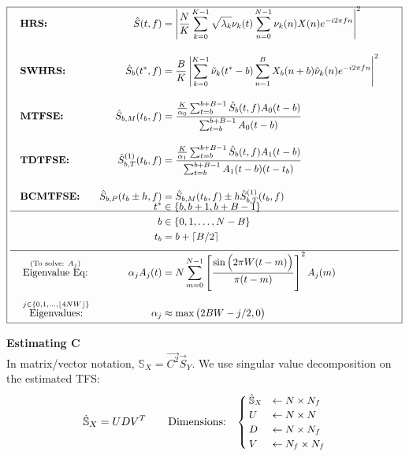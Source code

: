 \[\boxed{
\begin{aligned} &\\[-20pt]
    \quad&\textbf{HRS:}&
    \hat S(t,f)               &= \left|\frac{N}{K}\sum_{k=0}^{K-1}\sqrt{\lambda_k}\nu_k(t)
                                 \sum_{n=0}^{N-1}\nu_k(n)X(n)e^{-i2\pi fn}\right|^2
    \\[10pt]                                          
    &\textbf{SWHRS:}& 
    \hat S_{b}(t^*,f)         &= \frac{B}{K}\left| \sum_{k=0}^{K-1}\tilde\nu_k(t^*-b)
                                 \sum_{n=1}^{B} X_b(n+b)\tilde\nu_k(n)e^{-i2\pi fn} \right|^2\quad
    \\[10pt]
    &\textbf{MTFSE:}& 
    \hat S_{b,M}(t_b,f)       &= \frac{\frac{K}{\alpha_0}\sum_{t=b}^{b+B-1}\hat S_{b}(t,f)A_0(t-b)}
                                 {\sum_{t=b}^{b+B-1} A_0(t-b)}
    \\[10pt]
    &\textbf{TDTFSE:}& 
    \hat S^{(1)}_{b,T}(t_b,f) &= \frac{\frac{K}{\alpha_1}\sum_{t=b}^{b+B-1}\hat S_{b}(t,f)A_1(t-b)}
                                 {\sum_{t=b}^{b+B-1} A_1(t-b)(t-t_b)}
    \\[10pt]
    &\textbf{BCMTFSE:}&
    \hat S_{b,P}(t_b\pm h,f)  &= \hat S_{b,M}(t_b,f) \pm h\hat S^{(1)}_{b,T}(t_b,f)
    \\[7pt]
    \hline \\[-25pt]
    && t^* &\in \{b, b+1, b+B-1\}
    \\
    && b   &\in \{0,1,\dots, N-B\}
    \\
    && t_b &= b + \lceil B/2\rceil
    \\[7pt]
    \hline \\[-15pt]
    &\stackrel{\text{(To solve: }A_j)}{\text{Eigenvalue Eq:}}&
    \alpha_jA_j(t) &= N\sum_{m=0}^{N-1} \left[\frac{\sin\Big(2\pi W(t-m)\Big)}{\pi(t-m)}\right]^2A_j(m)
    \\[5pt]
    &\stackrel{j\in\{0,1,\dots,\lfloor 4NW\rfloor \}}{\text{Eigenvalues:}}&
    \alpha_j &\approx \max\big( 2BW - j/2, 0 \big) \qquad
\end{aligned}}
\]

\colorbox{bzadeh}{\color{black}\textbf{Estimating C}} \\
In matrix/vector notation, $\mathbb S_X = \vec {C^2} \vec S_Y$. 
We use singular value decomposition on the estimated TFS:
\[
\hat {\mathbb S}_X = UDV^T \qquad 
\text{Dimensions:}\quad
{\small\begin{cases}
    \hat {\mathbb S}_X &\leftarrow N\times N_f \\
    U &\leftarrow N\times N \\
    D &\leftarrow N\times N_f \\
    V &\leftarrow N_f \times N_f
\end{cases}}
\]

